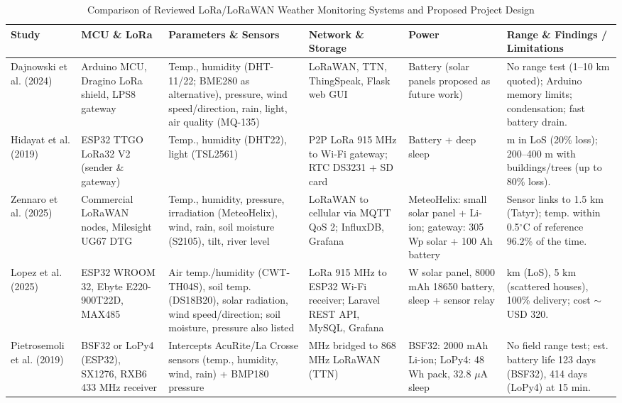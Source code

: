 \documentclass[conference]{IEEEtran}
\begin{document}
\begin{table}[t]
\centering
\caption{Comparison of Reviewed LoRa/LoRaWAN Weather Monitoring Systems and Proposed Project Design}
\label{tab:comparison}
\scriptsize
\renewcommand{\arraystretch}{1.05}
\begin{tabularx}{\textwidth}{>{\raggedright\arraybackslash}p{1.7cm} >{\raggedright\arraybackslash}p{2.3cm} >{\raggedright\arraybackslash}p{3.4cm} >{\raggedright\arraybackslash}p{2.7cm} >{\raggedright\arraybackslash}p{2.5cm} >{\raggedright\arraybackslash}X}
\toprule
\textbf{Study} & \textbf{MCU \& LoRa} & \textbf{Parameters \& Sensors} & \textbf{Network \& Storage} & \textbf{Power} & \textbf{Range \& Findings / Limitations} \\
\midrule
Dajnowski et al. (2024) \cite{dajnowski2024} & Arduino MCU, Dragino LoRa shield, LPS8 gateway & Temp., humidity (DHT-11/22; BME280 as alternative), pressure, wind speed/direction, rain, light, air quality (MQ-135) & LoRaWAN, TTN, ThingSpeak, Flask web GUI & Battery (solar panels proposed as future work) & No range test (1--10 km quoted); Arduino memory limits; condensation; fast battery drain. \\
\addlinespace[1pt]
Hidayat et al. (2019) \cite{hidayat2019} & ESP32 TTGO LoRa32 V2 (sender \& gateway) & Temp., humidity (DHT22), light (TSL2561) & P2P LoRa 915 MHz to Wi-Fi gateway; RTC DS3231 + SD card & Battery + deep sleep & 800 m in LoS (20\% loss); 200--400 m with buildings/trees (up to 80\% loss). \\
\addlinespace[1pt]
Zennaro et al. (2025) \cite{zennaro2025} & Commercial LoRaWAN nodes, Milesight UG67 DTG & Temp., humidity, pressure, irradiation (MeteoHelix), wind, rain, soil moisture (S2105), tilt, river level & LoRaWAN to cellular via MQTT QoS 2; InfluxDB, Grafana & MeteoHelix: small solar panel + Li-ion; gateway: 305 Wp solar + 100 Ah battery & Sensor links to 1.5 km (Tatyr); temp. within 0.5$^\circ$C of reference 96.2\% of the time. \\
\addlinespace[1pt]
Lopez et al. (2025) \cite{lopez2025} & ESP32 WROOM 32, Ebyte E220-900T22D, MAX485 & Air temp./humidity (CWT-TH04S), soil temp. (DS18B20), solar radiation, wind speed/direction; soil moisture, pressure also listed & LoRa 915 MHz to ESP32 Wi-Fi receiver; Laravel REST API, MySQL, Grafana & 37 W solar panel, 8000 mAh 18650 battery, sleep + sensor relay & 10 km (LoS), 5 km (scattered houses), 100\% delivery; cost $\sim$USD 320. \\
\addlinespace[1pt]
Pietrosemoli et al. (2019) \cite{pietrosemoli2019} & BSF32 or LoPy4 (ESP32), SX1276, RXB6 433 MHz receiver & Intercepts AcuRite/La Crosse sensors (temp., humidity, wind, rain) + BMP180 pressure & 433 MHz bridged to 868 MHz LoRaWAN (TTN) & BSF32: 2000 mAh Li-ion; LoPy4: 48 Wh pack, 32.8 $\mu$A sleep & No field range test; est. battery life 123 days (BSF32), 414 days (LoPy4) at 15 min. \\

\end{tabularx}
\end{table}
\end{document}
